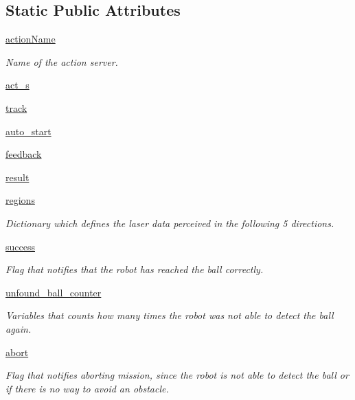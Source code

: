\subsection*{Static Public Attributes}
\begin{DoxyCompactItemize}
\item 
\hyperlink{classtrack_1_1TrackAction_abb57579f14aa39d1cc0f4379382390a6}{action\+Name}
\begin{DoxyCompactList}\small\item\em Name of the action server. \end{DoxyCompactList}\item 
\hyperlink{classtrack_1_1TrackAction_ae1870a4393e99629a3835f563374152e}{act\+\_\+s}
\item 
\hyperlink{classtrack_1_1TrackAction_a3d89a5a6bf3daf63df4b690e4c9a84a8}{track}
\item 
\hyperlink{classtrack_1_1TrackAction_aeb30f796983b2999ad62d71535795668}{auto\+\_\+start}
\item 
\hyperlink{classtrack_1_1TrackAction_acce0064c9d83a91f00d92a854014cdf5}{feedback}
\item 
\hyperlink{classtrack_1_1TrackAction_ae62bfb3233b566df94fde636d8d26877}{result}
\item 
\hyperlink{classtrack_1_1TrackAction_aca76f9e5333f65cf2da37f2b90d5f193}{regions}
\begin{DoxyCompactList}\small\item\em Dictionary which defines the laser data perceived in the following 5 directions. \end{DoxyCompactList}\item 
\hyperlink{classtrack_1_1TrackAction_a8c79189ba62cf316bffaa4c00b0320fe}{success}
\begin{DoxyCompactList}\small\item\em Flag that notifies that the robot has reached the ball correctly. \end{DoxyCompactList}\item 
\hyperlink{classtrack_1_1TrackAction_aabc16f100d1f260d6712d8d74e055fda}{unfound\+\_\+ball\+\_\+counter}
\begin{DoxyCompactList}\small\item\em Variables that counts how many times the robot was not able to detect the ball again. \end{DoxyCompactList}\item 
\hyperlink{classtrack_1_1TrackAction_a4fac0918d826dc6cbf110784c8fcda99}{abort}
\begin{DoxyCompactList}\small\item\em Flag that notifies aborting mission, since the robot is not able to detect the ball or if there is no way to avoid an obstacle. \end{DoxyCompactList}\item 

\end{DoxyCompactItemize}
